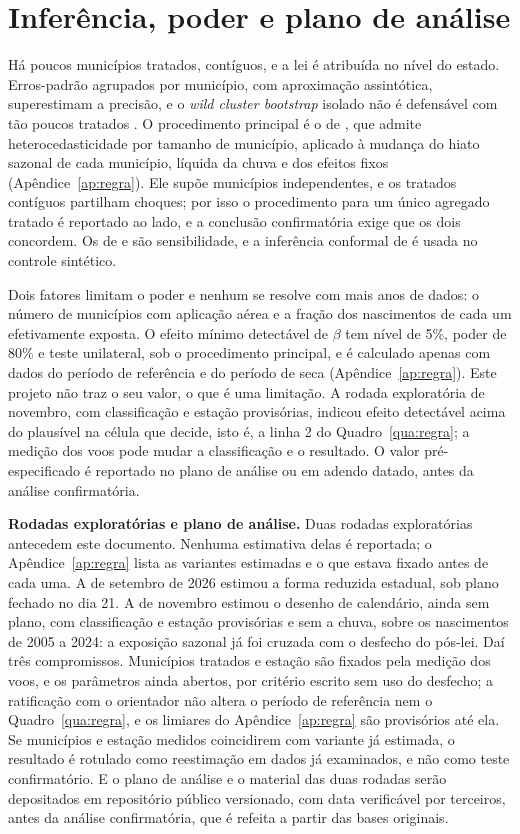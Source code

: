\section{Inferência, poder e plano de análise}
\label{sec:inferencia}

Há poucos municípios tratados, contíguos, e a lei é atribuída no nível do
estado. Erros-padrão agrupados por município, com aproximação assintótica,
superestimam a precisão, e o \emph{wild cluster bootstrap} isolado não é
defensável com tão poucos tratados \cite{mackinnon2018wild}. O procedimento
principal é o de , que admite
heterocedasticidade por tamanho de município, aplicado à mudança do hiato
sazonal de cada município, líquida da chuva e dos efeitos fixos
(Apêndice~\ref{ap:regra}). Ele supõe municípios independentes, e os tratados
contíguos partilham choques; por isso o procedimento para um único agregado
tratado \cite{hagemann2025single} é reportado ao lado, e a conclusão
confirmatória exige que os dois concordem. Os de  e
 são sensibilidade, e a inferência conformal de
 é usada no controle sintético.

Dois fatores limitam o poder e nenhum se resolve com mais anos de dados: o
número de municípios com aplicação aérea e a fração dos nascimentos de cada um
efetivamente exposta. O efeito mínimo detectável de $\beta$ tem nível de 5\%,
poder de 80\% e teste unilateral, sob o procedimento principal, e é calculado
apenas com dados do período de referência e do período de seca
(Apêndice~\ref{ap:regra}). Este projeto não traz o seu valor, o que é uma
limitação. A rodada exploratória de novembro, com classificação e estação
provisórias, indicou efeito detectável acima do plausível na célula que
decide, isto é, a linha 2 do Quadro~\ref{qua:regra}; a medição dos voos pode
mudar a classificação e o resultado. O valor pré-especificado é reportado no
plano de análise ou em adendo datado, antes da análise confirmatória.

\textbf{Rodadas exploratórias e plano de análise.} Duas rodadas exploratórias
antecedem este documento. Nenhuma estimativa delas é reportada; o
Apêndice~\ref{ap:regra} lista as variantes estimadas e o que estava fixado
antes de cada uma. A de setembro de 2026 estimou a forma reduzida estadual,
sob plano fechado no dia 21. A de novembro estimou o desenho de calendário,
ainda sem plano, com classificação e estação provisórias e sem a chuva, sobre
os nascimentos de 2005 a 2024: a exposição sazonal já foi cruzada com o
desfecho do pós-lei. Daí três compromissos. Municípios tratados e estação são
fixados pela medição dos voos, e os parâmetros ainda abertos, por critério
escrito sem uso do desfecho; a ratificação com o orientador não altera o
período de referência nem o Quadro~\ref{qua:regra}, e os limiares do
Apêndice~\ref{ap:regra} são provisórios até ela. Se municípios e estação medidos
coincidirem com variante já estimada, o resultado é rotulado como reestimação
em dados já examinados, e não como teste confirmatório. E o plano de análise
e o material das duas rodadas serão depositados em repositório público
versionado, com data verificável por terceiros, antes da análise
confirmatória, que é refeita a partir das bases originais.
